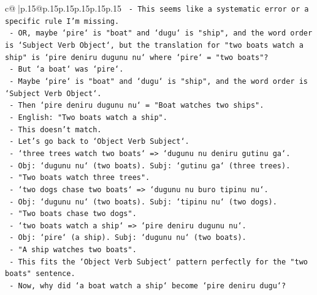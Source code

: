 \documentclass{article}
\begin{document}
{\begin{supertabular}{c@{$\;$}|p{.15\linewidth}@{}p{.15\linewidth}p{.15\linewidth}p{.15\linewidth}p{.15\linewidth}p{.15\linewidth}}
{{{\texttt{                           {-} This seems like a systematic error or a specific rule I'm missing.} \\
\texttt{                           {-} OR, maybe `pire` is "boat" and `dugu` is "ship", and the word order is `Subject Verb Object`, but the translation for "two boats watch a ship" is `pire deniru dugunu nu` where `pire` = "two boats"?} \\
\texttt{                           {-} But `a boat` was `pire`.} \\
\texttt{                           {-} Maybe `pire` is "boat" and `dugu` is "ship", and the word order is `Subject Verb Object`.} \\
\texttt{                           {-} Then `pire deniru dugunu nu` = "Boat watches two ships".} \\
\texttt{                           {-} English: "Two boats watch a ship".} \\
\texttt{                           {-} This doesn't match.} \\
\texttt{                           {-} Let's go back to `Object Verb Subject`.} \\
\texttt{                           {-} `three trees watch two boats` => `dugunu nu deniru gutinu ga`.} \\
\texttt{                             {-} Obj: `dugunu nu` (two boats). Subj: `gutinu ga` (three trees).} \\
\texttt{                             {-} "Two boats watch three trees".} \\
\texttt{                           {-} `two dogs chase two boats` => `dugunu nu buro tipinu nu`.} \\
\texttt{                             {-} Obj: `dugunu nu` (two boats). Subj: `tipinu nu` (two dogs).} \\
\texttt{                             {-} "Two boats chase two dogs".} \\
\texttt{                           {-} `two boats watch a ship` => `pire deniru dugunu nu`.} \\
\texttt{                             {-} Obj: `pire` (a ship). Subj: `dugunu nu` (two boats).} \\
\texttt{                             {-} "A ship watches two boats".} \\
\texttt{                           {-} This fits the `Object Verb Subject` pattern perfectly for the "two boats" sentence.} \\
\texttt{                           {-} Now, why did `a boat watch a ship` become `pire deniru dugu`?} \\
}}}
\end{supertabular}}
\end{document}
